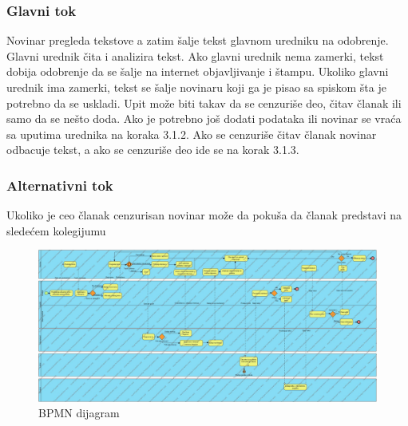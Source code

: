 \subsubsection{Glavni tok}
Novinar pregleda tekstove a zatim šalje tekst glavnom uredniku na odobrenje. Glavni urednik čita i analizira tekst. Ako glavni urednik nema zamerki, tekst dobija odobrenje da se šalje na internet objavljivanje i štampu. Ukoliko glavni urednik ima zamerki, tekst se šalje novinaru koji ga je pisao sa spiskom šta je potrebno da se uskladi. Upit može biti takav da se cenzuriše deo, čitav članak ili samo da se nešto doda. Ako je potrebno još dodati podataka ili novinar se vraća sa uputima urednika na koraka 3.1.2. Ako se cenzuriše čitav članak novinar odbacuje tekst, a ako se cenzuriše deo ide se na korak 3.1.3.
\subsubsection{Alternativni tok}
Ukoliko je ceo članak cenzurisan novinar može da pokuša da članak predstavi na sledećem kolegijumu 

	

\begin{figure}[htp]
    \centering
    \includegraphics[width=0.9\textheight, angle=90]{slike/1-bpmn}
    \caption{BPMN dijagram}
    \label{pisanje}
\end{figure}	